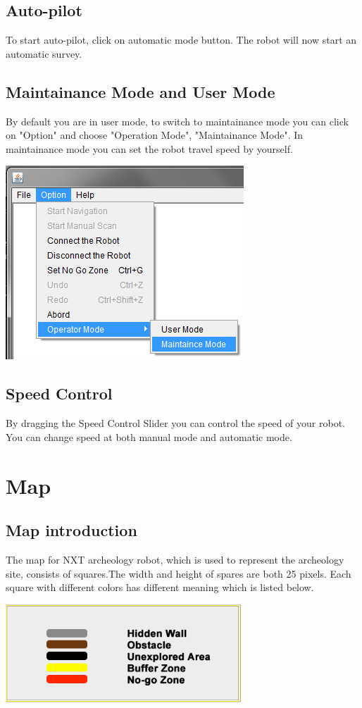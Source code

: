 \documentclass[11pt, a4paper]{report}
\begin{document}
\section{Auto-pilot}
To start auto-pilot, click on automatic mode button. The robot will now start an automatic survey.
\section{Maintainance Mode and User Mode}
By default you are in user mode, to switch to maintainance mode you can click on "Option" and choose "Operation Mode", "Maintainance Mode". In maintainance mode you can set the robot travel speed by yourself.
\begin{center}
\includegraphics[scale=1]{./image/MainMode.png}\\[1cm]
\end{center}

\section{Speed Control}
By dragging the Speed Control Slider you can control the speed of your robot. You can change speed at both manual mode and automatic mode. 



\chapter{Map}

\section{Map introduction}
The map for NXT archeology robot, which is used to represent the archeology site, consists of squares.The width and height of spares are both 25 pixels. Each square with different colors has different meaning which is listed below.
\begin{center}
\includegraphics[scale=1]{./image/ColorList.png}\\[1cm]
\end{center}
\end{document}
